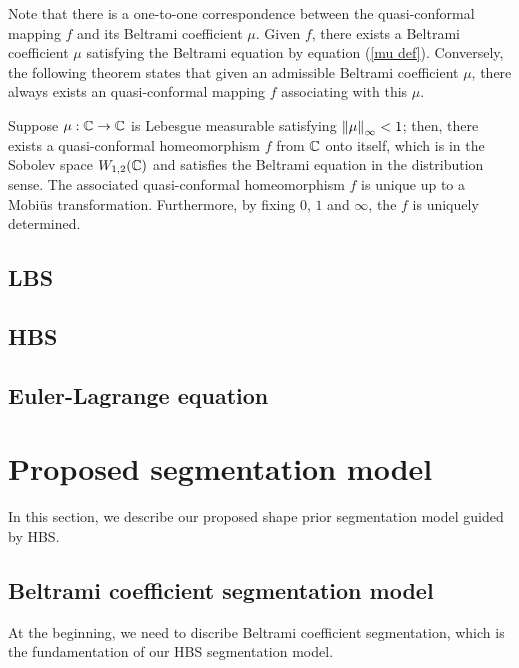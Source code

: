\documentclass[review,onefignum,onetabnum]{siamonline190516}
\begin{document}
Note that there is a one-to-one correspondence between the quasi-conformal mapping $f$ and its Beltrami coefficient $\mu$. Given $f$, there exists a Beltrami coefficient $\mu$ satisfying the Beltrami equation by equation (\ref{mu def}). Conversely, the following theorem states that given an admissible Beltrami coefficient $\mu$, there always exists an quasi-conformal mapping $f$ associating with this $\mu$.

\begin{theorem}\label{Measurable Riemannian Mapping Theorem}
    Suppose $\mu : \mathbb{C} \rightarrow \mathbb{C}$ is Lebesgue measurable satisfying $\left\Vert \mu \right\Vert_\infty <1$; then, there exists a quasi-conformal homeomorphism $f$ from $\mathbb{C}$ onto itself, which is in the Sobolev space $W_{1,2}(\mathbb{C})$ and satisfies the Beltrami equation in the distribution sense. The associated quasi-conformal homeomorphism $f$ is unique up to a Mobi\"us transformation. Furthermore, by fixing $0$, $1$ and $\infty$, the $f$ is uniquely determined.
\end{theorem}

\subsection{LBS}

\subsection{HBS}

\subsection{Euler-Lagrange equation}

\section{Proposed segmentation model}\label{main}
In this section, we describe our proposed shape prior segmentation model guided by HBS.

\subsection{Beltrami coefficient segmentation model}
At the beginning, we need to discribe Beltrami coefficient segmentation, which is the fundamentation of our HBS segmentation model. 
\end{document}
